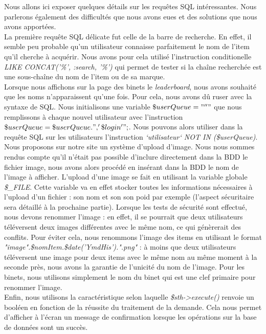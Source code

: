 \documentclass[titlepage,11pt,a4paper]{article}
\begin{document}
Nous allons ici exposer quelques détails sur les requêtes SQL intéressantes. Nous parlerons également des difficultés que nous avons eues et des solutions que nous avons apportées.\\

La première requête SQL délicate fut celle de la barre de recherche. En effet, il semble peu probable qu'un utilisateur connaisse parfaitement le nom de l'item qu'il cherche à acquérir. Nous avons pour cela utilisé l'instruction conditionelle \emph{LIKE CONCAT('\%', :search, '\%')} qui permet de tester si la chaîne recherchée est une sous-chaîne du nom de l'item ou de sa marque.\\

Lorsque nous affichons sur la page des binets le \emph{leaderboard}, nous avons souhaité que les noms n'apparaissent qu'une fois. Pour cela, nous avons dû ruser avec la syntaxe de SQL. Nous initialisons une variable $\$userQueue="''"$ que nous remplissons à chaque nouvel utilisateur avec l'instruction $\$userQueue=\$userQueue.", '\$login'";$. Nous pouvons alors utiliser dans la requête SQL sur les utilisateurs l'instruction \emph{`utilisateur` NOT IN (\$userQueue)}.\\

Nous proposons sur notre site un système d'upload d'image. Nous nous sommes rendus compte qu'il n'était pas possible d'inclure directement dans la BDD le fichier image, nous avons alors procédé en insérant dans la BDD le nom de l'image à afficher. L'upload d'une image se fait en utilisant la variable globale \emph{\$\_FILE}. Cette variable va en effet stocker toutes les informations nécessaires à l'upload d'un fichier : son nom et son son poid par exemple (l'aspect sécuritaire sera détaillé à la prochaine partie). Lorsque les tests de sécurité sont effectué, nous devons renommer l'image : en effet, il se pourrait que deux utilisateurs téléversent deux images différentes avec le même nom, ce qui génèrerait des conflits. Pour éviter cela, nous renommons l'image des items en utilisant le format \emph{"image".\$nomItem.\$date('YmdHis').".png"} : à moins que deux utilisateurs téléversent une image pour deux items avec le même nom au même moment à la seconde près, nous avons la garantie de l'unicité du nom de l'image. Pour les binets, nous utilisons simplement le nom du binet qui est une clef primaire pour renommer l'image.\\

Enfin, nous utilisons la caractéristique selon laquelle \emph{\$sth->execute()} renvoie un booléen en fonction de la réussite du traitement de la demande. Cela nous permet d'afficher à l'écran un message de confirmation lorsque les opérations sur la base de données sont un succès.
\end{document}
